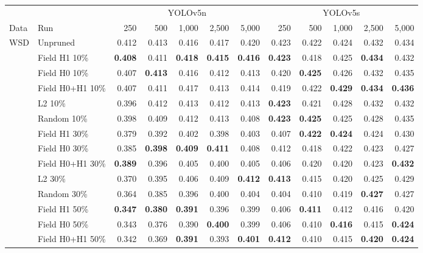 \begin{tabular}{llrrrrrrrrrr}
\toprule
 & & \multicolumn{5}{c}{YOLOv5n} & \multicolumn{5}{c}{YOLOv5s} \\
\cmidrule(lr){3-7}\cmidrule(lr){8-12}
Data & Run & 250 & 500 & 1,000 & 2,500 & 5,000 & 250 & 500 & 1,000 & 2,500 & 5,000 \\
\midrule
WSD & Unpruned & 0.412 & 0.413 & 0.416 & 0.417 & 0.420 & 0.423 & 0.422 & 0.424 & 0.432 & 0.434 \\
 & Field H1 10\% & \textbf{0.408} & 0.411 & \textbf{0.418} & \textbf{0.415} & \textbf{0.416} & \textbf{0.423} & 0.418 & 0.425 & \textbf{0.434} & 0.432 \\
 & Field H0 10\% & 0.407 & \textbf{0.413} & 0.416 & 0.412 & 0.413 & 0.420 & \textbf{0.425} & 0.426 & 0.432 & 0.435 \\
 & Field H0+H1 10\% & 0.407 & 0.411 & 0.417 & 0.413 & 0.414 & 0.419 & 0.422 & \textbf{0.429} & \textbf{0.434} & \textbf{0.436} \\
 & L2 10\% & 0.396 & 0.412 & 0.413 & 0.412 & 0.413 & \textbf{0.423} & 0.421 & 0.428 & 0.432 & 0.432 \\
 & Random 10\% & 0.398 & 0.409 & 0.412 & 0.413 & 0.408 & \textbf{0.423} & \textbf{0.425} & 0.425 & 0.428 & 0.435 \\
\addlinespace[2pt]
 & Field H1 30\% & 0.379 & 0.392 & 0.402 & 0.398 & 0.403 & 0.407 & \textbf{0.422} & \textbf{0.424} & 0.424 & 0.430 \\
 & Field H0 30\% & 0.385 & \textbf{0.398} & \textbf{0.409} & \textbf{0.411} & 0.408 & 0.412 & 0.418 & 0.422 & 0.423 & 0.427 \\
 & Field H0+H1 30\% & \textbf{0.389} & 0.396 & 0.405 & 0.400 & 0.405 & 0.406 & 0.420 & 0.420 & 0.423 & \textbf{0.432} \\
 & L2 30\% & 0.370 & 0.395 & 0.406 & 0.409 & \textbf{0.412} & \textbf{0.413} & 0.415 & 0.420 & 0.425 & 0.429 \\
 & Random 30\% & 0.364 & 0.385 & 0.396 & 0.400 & 0.404 & 0.404 & 0.410 & 0.419 & \textbf{0.427} & 0.427 \\
\addlinespace[2pt]
 & Field H1 50\% & \textbf{0.347} & \textbf{0.380} & \textbf{0.391} & 0.396 & 0.399 & 0.406 & \textbf{0.411} & 0.412 & 0.416 & 0.420 \\
 & Field H0 50\% & 0.343 & 0.376 & 0.390 & \textbf{0.400} & 0.399 & 0.406 & 0.410 & \textbf{0.416} & 0.415 & \textbf{0.424} \\
 & Field H0+H1 50\% & 0.342 & 0.369 & \textbf{0.391} & 0.393 & \textbf{0.401} & \textbf{0.412} & 0.410 & 0.415 & \textbf{0.420} & \textbf{0.424} \\

\end{tabular}

